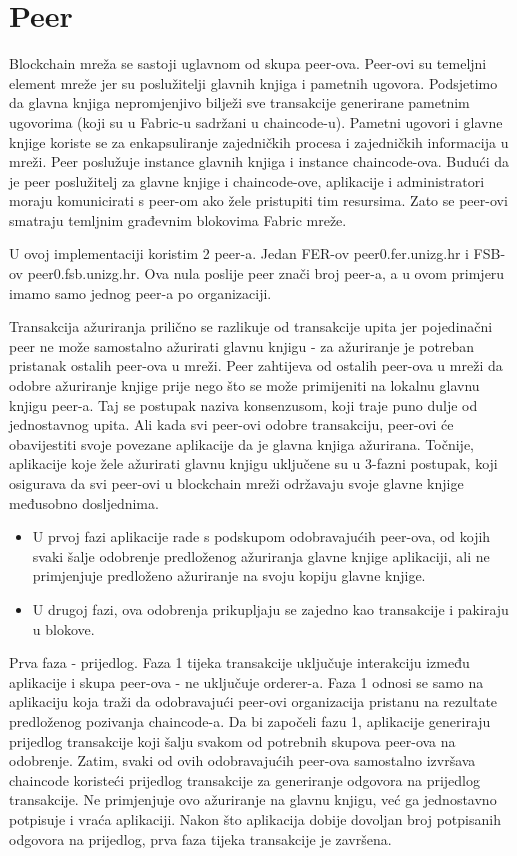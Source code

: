 \documentclass[times, utf8, diplomski]{fer}
\begin{document}
\section{Peer}
Blockchain mreža se sastoji uglavnom od skupa peer-ova. Peer-ovi su temeljni element mreže jer su poslužitelji glavnih knjiga i pametnih ugovora. Podsjetimo da glavna knjiga nepromjenjivo bilježi sve transakcije generirane pametnim ugovorima (koji su u Fabric-u sadržani u chaincode-u). Pametni ugovori i glavne knjige koriste se za enkapsuliranje zajedničkih procesa i zajedničkih informacija u mreži.
Peer poslužuje instance glavnih knjiga i instance chaincode-ova.
Budući da je peer poslužitelj za glavne knjige i chaincode-ove,  aplikacije i administratori moraju komunicirati s peer-om ako žele pristupiti tim resursima. Zato se peer-ovi smatraju temljnim građevnim blokovima Fabric mreže. 

U ovoj implementaciji koristim 2 peer-a. Jedan FER-ov peer0.fer.unizg.hr i FSB-ov peer0.fsb.unizg.hr. Ova nula poslije peer znači broj peer-a, a u ovom primjeru imamo samo jednog peer-a po organizaciji.  

Transakcija ažuriranja prilično se razlikuje od transakcije upita jer pojedinačni peer ne može samostalno ažurirati glavnu knjigu - za ažuriranje je potreban pristanak ostalih peer-ova u mreži. Peer zahtijeva od ostalih peer-ova u mreži da odobre ažuriranje knjige prije nego što se može primijeniti na lokalnu glavnu knjigu peer-a. Taj se postupak naziva konsenzusom,  koji traje puno dulje od jednostavnog upita. Ali kada svi peer-ovi odobre transakciju,  peer-ovi će obavijestiti svoje povezane aplikacije da je glavna knjiga ažurirana.  Točnije, aplikacije koje žele ažurirati glavnu knjigu uključene su u 3-fazni postupak, koji osigurava da svi peer-ovi u blockchain mreži održavaju svoje glavne knjige međusobno dosljednima.

\begin{itemize}
\item U prvoj fazi aplikacije rade s podskupom odobravajućih peer-ova, od kojih svaki šalje odobrenje predloženog ažuriranja glavne knjige aplikaciji, ali ne primjenjuje predloženo ažuriranje na svoju kopiju glavne knjige.
\item U drugoj fazi,  ova odobrenja prikupljaju se zajedno kao transakcije i pakiraju u blokove.
\end{itemize}

Prva faza - prijedlog.  Faza 1 tijeka transakcije uključuje interakciju između aplikacije i skupa peer-ova - ne uključuje orderer-a. Faza 1 odnosi se samo na aplikaciju koja traži da odobravajući peer-ovi organizacija pristanu na rezultate predloženog pozivanja chaincode-a. Da bi započeli fazu 1, aplikacije generiraju prijedlog transakcije koji šalju svakom od potrebnih skupova peer-ova na odobrenje. Zatim, svaki od ovih odobravajućih peer-ova samostalno izvršava chaincode koristeći prijedlog transakcije za generiranje odgovora na prijedlog transakcije. Ne primjenjuje ovo ažuriranje na glavnu knjigu, već ga jednostavno potpisuje i vraća aplikaciji. Nakon što aplikacija dobije dovoljan broj potpisanih odgovora na prijedlog, prva faza tijeka transakcije je završena.
\end{document}
